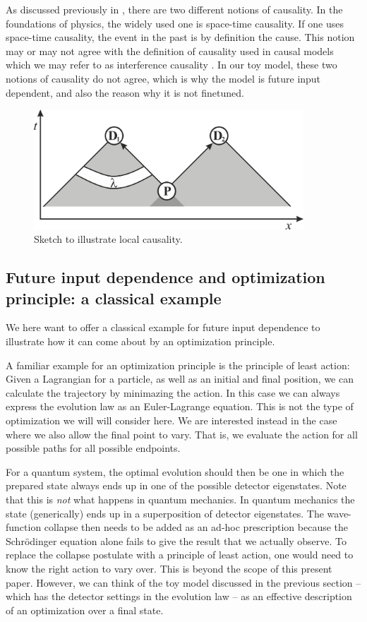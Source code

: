 \documentclass[12pt]{article}
\begin{document}
As discussed previously in \cite{otherpaper}, there are two different notions of causality. In the foundations of physics, the widely used one is space-time causality. If one uses space-time causality, the event in the past is by definition the cause. This notion may or may not agree with the definition of causality used in causal models which we may refer to as interference causality \cite{Spirtes,Pearl}. In our toy model, these two notions of causality do not agree, which is why the model is future input dependent, and also the reason why it is not finetuned.  


\begin{figure}[h]
\centering
\includegraphics[width=0.9\textwidth]{bell.png}
\caption{Sketch to illustrate local causality.}
\label{bell}
\end{figure}

\subsection{Future input dependence and optimization principle: a classical example}

We here want to offer a classical example for future input dependence to illustrate how it can come about by an optimization principle. 

A familiar example for an optimization principle is the principle of least action: Given a Lagrangian for a particle, as well as an initial and final position, we can calculate the trajectory by minimazing the action.  In this case we can always express the evolution law as an Euler-Lagrange equation.
This is not the type of optimization we will will consider here. We are interested instead in the case where we also allow the final point to vary. That is, we evaluate the action for all possible paths for all possible endpoints. 

For a quantum system, the optimal evolution should then be one in which the prepared state always ends up in one of the possible detector eigenstates. Note that this is {\sl not} what happens in quantum mechanics. In quantum mechanics the state (generically) ends up in a superposition of detector eigenstates. The wave-function collapse then needs to be added as an ad-hoc prescription because the Schr\"odinger equation alone fails to give the result that we actually observe. To replace the collapse postulate with a principle of least action, one would need to know the right action to vary over. This is beyond the scope of this present paper. However, we can think of the toy model discussed in the previous section -- which has the detector settings in the evolution law -- as an effective description of an optimization over a final state. 
\end{document}
